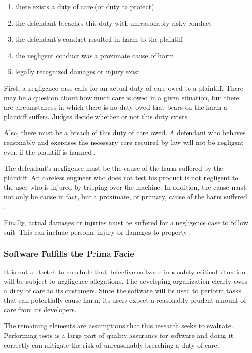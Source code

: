 \singlespace
\begin{enumerate}
 \item there exists a duty of care (or duty to protect)
 \item the defendant breaches this duty with unreasonably risky conduct
 \item the defendant's conduct resulted in harm to the plaintiff
 \item the negligent conduct was a proximate cause of harm
 \item legally recognized damages or injury exist
\end{enumerate}
\doublespace

First, a negligence case calls for an actual duty of care owed to a plaintiff.
There may be a question about how much care is owed in a given situation, but
there are circumstances in which there is no duty owed that bears on the harm a
plaintiff suffers. Judges decide whether or not this duty exists \cite{Dobbs01}.

Also, there must be a breach of this duty of care owed. A defendant who behaves
reasonably and exercises the necessary care required by law will not be
negligent even if the plaintiff is harmed \cite{Dobbs01}.

The defendant's negligence must be the cause of the harm suffered by the
plaintiff. An careless engineer who does not test his product is not negligent
to the user who is injured by tripping over the machine. In addition, the cause
must not only be cause in fact, but a proximate, or primary, cause of the harm
suffered \cite{Dobbs01}.

Finally, actual damages or injuries must be suffered for a negligence case to
follow suit. This can include personal injury or damages to property
\cite{Dobbs01}.

\subsubsection{Software Fulfills the Prima Facie}

It is not a stretch to conclude that defective software in a safety-critical
situation will be subject to negligence allegations. The developing
organization clearly owes a duty of care to its customers. Since the software
will be used to perform tasks that can potentially cause harm, its users expect
a reasonably prudent amount of care from its developers.

The remaining elements are assumptions that this research seeks to evaluate.
Performing tests is a large part of quality assurance for software and doing it
correctly can mitigate the risk of unreasonably breaching a duty of care.
